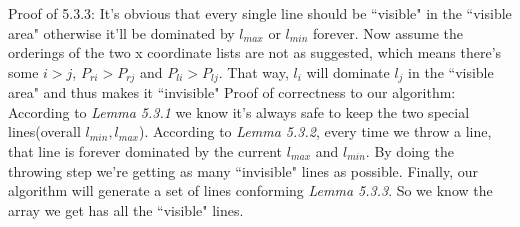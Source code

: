 \documentclass[11pt]{article}
\begin{document}
	\newline
	Proof of 5.3.3: It's obvious that every single line should be ``visible" in the ``visible area" otherwise it'll be dominated by $l_{max}$ or $l_{min}$ forever. Now assume the orderings of the two x coordinate lists are not as suggested, which means there's some $i > j$, $P_{ri} > P_{rj}$ and $P_{li} > P_{lj}$. That way, $l_{i}$ will dominate $l_{j}$ in the ``visible area" and thus makes it ``invisible"\newline
	\newline
	Proof of correctness to our algorithm: According to \textit{Lemma 5.3.1} we know it's always safe to keep the two special lines(overall $l_{min}, l_{max}$). According to \textit{Lemma 5.3.2}, every time we throw a line, that line is forever dominated by the current $l_{max}$ and $l_{min}$. By doing the throwing step we're getting as many ``invisible" lines as possible. Finally, our algorithm will generate a set of lines conforming \textit{Lemma 5.3.3}. So we know the array we get has all the ``visible" lines.
\end{document}
